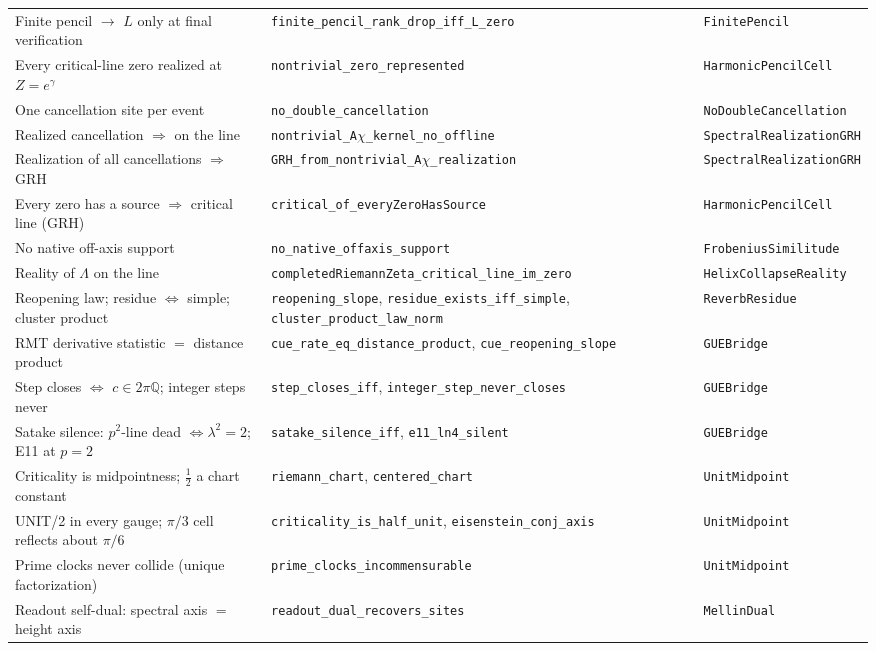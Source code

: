 \documentclass[11pt]{article}
\newcommand{\Q}{\mathbb{Q}}
\newcommand{\code}[1]{\texttt{#1}}
\begin{document}
\begin{longtable}{p{} p{} p{}}
Finite pencil $\to$ $L$ only at final verification & \code{finite\_pencil\_rank\_drop\_iff\_L\_zero} & \code{FinitePencil}\\
Every critical-line zero realized at $Z=e^{\gamma}$ & \code{nontrivial\_zero\_represented} & \code{HarmonicPencilCell}\\
One cancellation site per event & \code{no\_double\_cancellation} & \code{NoDoubleCancellation}\\
Realized cancellation $\Rightarrow$ on the line & \code{nontrivial\_A$\chi$\_kernel\_no\_offline} & \code{SpectralRealizationGRH}\\
Realization of all cancellations $\Rightarrow$ GRH & \code{GRH\_from\_nontrivial\_A$\chi$\_realization} & \code{SpectralRealizationGRH}\\
Every zero has a source $\Rightarrow$ critical line (GRH) & \code{critical\_of\_everyZeroHasSource} & \code{HarmonicPencilCell}\\
No native off-axis support & \code{no\_native\_offaxis\_support} & \code{FrobeniusSimilitude}\\
Reality of $\Lambda$ on the line & \code{completedRiemannZeta\_critical\_line\_im\_zero} & \code{HelixCollapseReality}\\
Reopening law; residue $\iff$ simple; cluster product & \code{reopening\_slope}, \code{residue\_exists\_iff\_simple}, \code{cluster\_product\_law\_norm} & \code{ReverbResidue}\\
RMT derivative statistic $=$ distance product & \code{cue\_rate\_eq\_distance\_product}, \code{cue\_reopening\_slope} & \code{GUEBridge}\\
Step closes $\iff$ $c\in2\pi\Q$; integer steps never & \code{step\_closes\_iff}, \code{integer\_step\_never\_closes} & \code{GUEBridge}\\
Satake silence: $p^2$-line dead $\iff\lambda^2=2$; E11 at $p{=}2$ & \code{satake\_silence\_iff}, \code{e11\_ln4\_silent} & \code{GUEBridge}\\
Criticality is midpointness; $\tfrac12$ a chart constant & \code{riemann\_chart}, \code{centered\_chart} & \code{UnitMidpoint}\\
UNIT/2 in every gauge; $\pi/3$ cell reflects about $\pi/6$ & \code{criticality\_is\_half\_unit}, \code{eisenstein\_conj\_axis} & \code{UnitMidpoint}\\
Prime clocks never collide (unique factorization) & \code{prime\_clocks\_incommensurable} & \code{UnitMidpoint}\\
Readout self-dual: spectral axis $=$ height axis & \code{readout\_dual\_recovers\_sites} & \code{MellinDual}\\

\end{longtable}
\end{document}
